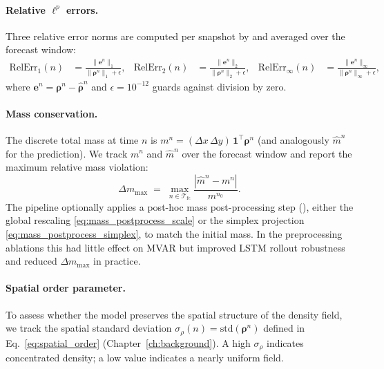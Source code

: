 \documentclass{report}
\theoremstyle{plain}
\theoremstyle{remark}
\numberwithin{equation}{section}              %
\begin{document}
\paragraph{Relative $\ell^p$ errors.}
\label{subsec:rel_errors}
Three relative error norms are computed per snapshot by
 and averaged over the
forecast window:
\begin{align}
  \mathrm{RelErr}_1(n) &= \frac{\|\boldsymbol{e}^n\|_1}{\|\boldsymbol{\rho}^n\|_1 + \epsilon},
  &
  \mathrm{RelErr}_2(n) &= \frac{\|\boldsymbol{e}^n\|_2}{\|\boldsymbol{\rho}^n\|_2 + \epsilon},
  &
  \mathrm{RelErr}_\infty(n) &= \frac{\|\boldsymbol{e}^n\|_\infty}{\|\boldsymbol{\rho}^n\|_\infty + \epsilon},
  \label{eq:rel_errors}
\end{align}
where $\boldsymbol{e}^n = \boldsymbol{\rho}^n - \hat{\boldsymbol{\rho}}^n$
and $\epsilon = 10^{-12}$ guards against division by zero.

\paragraph{Mass conservation.}
\label{subsec:mass_metric}
The discrete total mass at time $n$ is
$m^n = (\Delta x\,\Delta y)\,\mathbf{1}^\top\boldsymbol{\rho}^n$ (and
analogously $\hat m^n$ for the prediction).  We track $m^n$ and $\hat m^n$
over the forecast window and report the maximum relative mass violation:
\begin{equation}
  \Delta m_{\max} \;=\;\max_{n\in\mathcal{T}_{\mathrm{fc}}}
    \frac{|\hat m^n - m^n|}{m^{n_0}}.
  \label{eq:mass_violation}
\end{equation}
The pipeline optionally applies a post-hoc mass post-processing step
(), either the global rescaling
\eqref{eq:mass_postprocess_scale} or the simplex projection
\eqref{eq:mass_postprocess_simplex}, to match the initial mass.  In the
preprocessing ablations this had little effect on MVAR but improved LSTM
rollout robustness and reduced $\Delta m_{\max}$ in practice.

\paragraph{Spatial order parameter.}
\label{subsec:spatial_order_metric}
To assess whether the model preserves the spatial structure of the density
field, we track the spatial standard deviation
$\sigma_\rho(n) = \mathrm{std}(\boldsymbol{\rho}^n)$ defined in
Eq.~\eqref{eq:spatial_order} (Chapter~\ref{ch:background}).
A high $\sigma_\rho$ indicates concentrated density; a low value
indicates a nearly uniform field.
\end{document}
